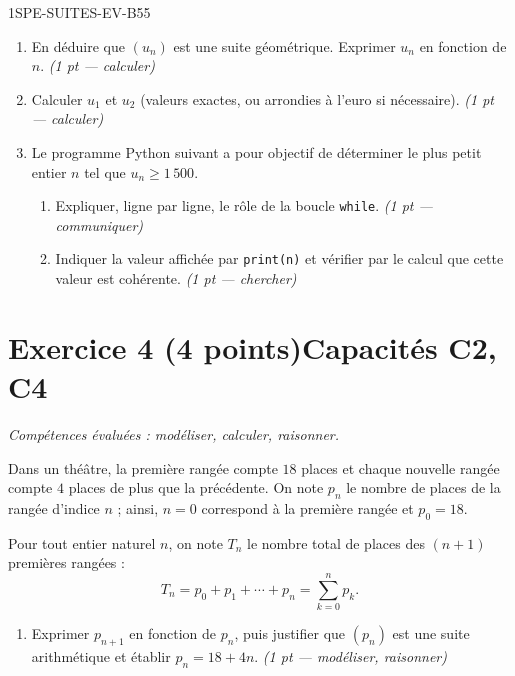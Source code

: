 \begin{evaluation}{1SPE-SUITES-EV-B}{55}
\begin{enumerate}
  \item En déduire que $(u_n)$ est une suite géométrique. Exprimer $u_n$ en fonction de $n$.
  \ifnxVersionProfesseur\hfill\textit{(1 pt — calculer)}\fi

  \item Calculer $u_1$ et $u_2$ (valeurs exactes, ou arrondies à l'euro si nécessaire).
  \ifnxVersionProfesseur\hfill\textit{(1 pt — calculer)}\fi

  \item Le programme Python suivant a pour objectif de déterminer le plus petit entier $n$ tel que $u_n \geq 1\,500$.



  \begin{enumerate}
    \item Expliquer, ligne par ligne, le rôle de la boucle \texttt{while}.
    \ifnxVersionProfesseur\hfill\textit{(1 pt — communiquer)}\fi
    \item Indiquer la valeur affichée par \texttt{print(n)} et vérifier par le calcul que cette valeur est cohérente.
    \ifnxVersionProfesseur\hfill\textit{(1 pt — chercher)}\fi
  \end{enumerate}
\end{enumerate}

\section*{Exercice 4 \ifnxVersionProfesseur\hfill (4 points)\fi \hfill Capacités C2, C4}

\textit{Compétences évaluées : modéliser, calculer, raisonner.}

\medskip
Dans un théâtre, la première rangée compte $18$ places et chaque nouvelle
rangée compte $4$ places de plus que la précédente. On note $p_n$ le nombre de
places de la rangée d'indice $n$ ; ainsi, $n=0$ correspond à la première rangée
et $p_0=18$.

Pour tout entier naturel $n$, on note $T_n$ le nombre total de places des
$(n+1)$ premières rangées :
\[
  T_n=p_0+p_1+\cdots+p_n=\sum_{k=0}^{n}p_k.
\]

\begin{enumerate}
  \item Exprimer $p_{n+1}$ en fonction de $p_n$, puis justifier que $(p_n)$ est
  une suite arithmétique et établir $p_n=18+4n$.
  \ifnxVersionProfesseur\hfill\textit{(1 pt — modéliser, raisonner)}\fi


\end{enumerate}
\end{evaluation}
